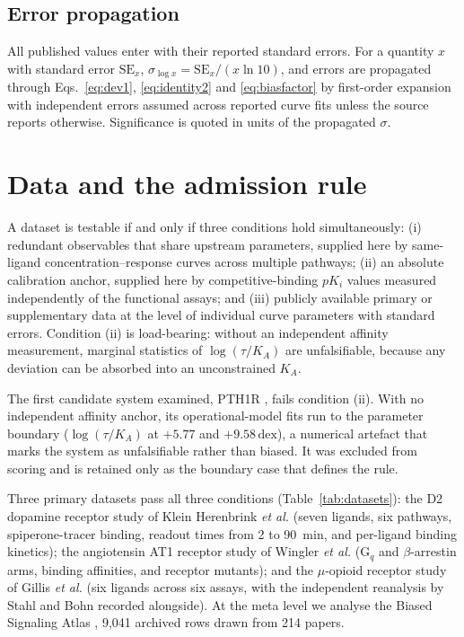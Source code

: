 ﻿\documentclass[11pt,a4paper]{article}
\newcommand{\dex}{\ensuremath{\,\mathrm{dex}}}
\newcommand{\pKi}{\ensuremath{p\!K_{i}}}
\newcommand{\logR}{\ensuremath{\log(\tau/K_{\!A})}}
\begin{document}
\subsection{Error propagation}

All published values enter with their reported standard errors. For a quantity $x$ with standard error $\mathrm{SE}_x$, $\sigma_{\log x}=\mathrm{SE}_x/(x\ln 10)$, and errors are propagated through Eqs.~\eqref{eq:dev1}, \eqref{eq:identity2} and \eqref{eq:biasfactor} by first-order expansion with independent errors assumed across reported curve fits unless the source reports otherwise. Significance is quoted in units of the propagated $\sigma$.

\section{Data and the admission rule}
\label{sec:data}

A dataset is testable if and only if three conditions hold simultaneously: (i) redundant observables that share upstream parameters, supplied here by same-ligand concentration--response curves across multiple pathways; (ii) an absolute calibration anchor, supplied here by competitive-binding $\pKi$ values measured independently of the functional assays; and (iii) publicly available primary or supplementary data at the level of individual curve parameters with standard errors. Condition (ii) is load-bearing: without an independent affinity measurement, marginal statistics of $\logR$ are unfalsifiable, because any deviation can be absorbed into an unconstrained $K_{\!A}$.

The first candidate system examined, PTH1R \cite{Sachdev2024}, fails condition (ii). With no independent affinity anchor, its operational-model fits run to the parameter boundary ($\logR$ at $+5.77$ and $+9.58\dex$), a numerical artefact that marks the system as unfalsifiable rather than biased. It was excluded from scoring and is retained only as the boundary case that defines the rule.

Three primary datasets pass all three conditions (Table~\ref{tab:datasets}): the D2 dopamine receptor study of Klein Herenbrink \emph{et al.} \cite{KleinHerenbrink2016} (seven ligands, six pathways, spiperone-tracer binding, readout times from 2 to 90~min, and per-ligand binding kinetics); the angiotensin AT1 receptor study of Wingler \emph{et al.} \cite{Wingler2020} (G$_q$ and $\beta$-arrestin arms, binding affinities, and receptor mutants); and the $\mu$-opioid receptor study of Gillis \emph{et al.} \cite{Gillis2020} (six ligands across six assays, with the independent reanalysis by Stahl and Bohn \cite{StahlBohn2022} recorded alongside). At the meta level we analyse the Biased Signaling Atlas \cite{BSA}, 9{,}041 archived rows drawn from 214 papers.
\end{document}
